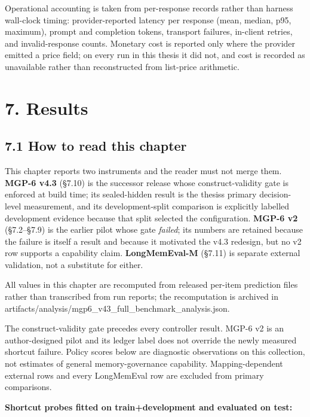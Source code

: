 Operational accounting is taken from per-response records rather than
harness wall-clock timing: provider-reported latency per response (mean,
median, p95, maximum), prompt and completion tokens, transport failures,
in-client retries, and invalid-response counts. Monetary cost is
reported only where the provider emitted a price field; on every run in
this thesis it did not, and cost is recorded as unavailable rather than
reconstructed from list-price arithmetic.

\section{7. Results}\label{results}

\subsection{7.1 How to read this
chapter}\label{how-to-read-this-chapter}

This chapter reports two instruments and the reader must not merge them.
\textbf{MGP-6 v4.3} (§7.10) is the successor release whose
construct-validity gate is enforced at build time; its sealed-hidden
result is the thesis\textquotesingle s primary decision-level
measurement, and its development-split comparison is explicitly labelled
development evidence because that split selected the configuration.
\textbf{MGP-6 v2} (§7.2--§7.9) is the earlier pilot whose gate
\emph{failed}; its numbers are retained because the failure is itself a
result and because it motivated the v4.3 redesign, but no v2 row
supports a capability claim. \textbf{LongMemEval-M} (§7.11) is separate
external validation, not a substitute for either.

All values in this chapter are recomputed from released per-item
prediction files rather than transcribed from run reports; the
recomputation is archived in
artifacts/analysis/mgp6\_v43\_full\_benchmark\_analysis.json.

The construct-validity gate precedes every controller result. MGP-6 v2
is an author-designed pilot and its ledger label does not override the
newly measured shortcut failure. Policy scores below are diagnostic
observations on this collection, not estimates of general
memory-governance capability. Mapping-dependent external rows and every
LongMemEval row are excluded from primary comparisons.

\textbf{Shortcut probes fitted on train+development and evaluated on
test:}

